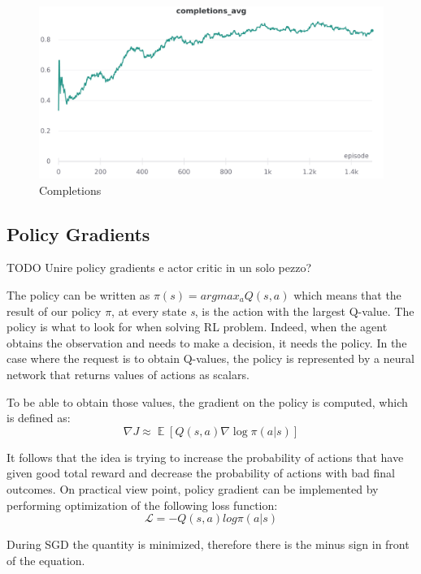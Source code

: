 \documentclass[12pt]{article}
\DeclareMathOperator{\EX}{\mathbb{E}}%
\begin{document}
\begin{figure}[H]
        \centerline{\includegraphics[scale=.2]{res/charts/per_completions.png}}
        \caption{Completions}
\end{figure}

\subsection{Policy Gradients}

TODO Unire policy gradients e actor critic in un solo pezzo?

The policy can be written as $\pi(s)= argmax_aQ(s,a)$ which means that the result of our policy $\pi$, at every state \textit{s}, is the action with the largest Q-value.
The policy is what to look for when solving RL problem. Indeed, when the agent obtains the observation and needs to make a decision, it needs the policy.
In the case where the request is to obtain Q-values, the policy is represented by a neural network that returns values of actions as scalars. 

To be able to obtain those values, the gradient on the policy is computed, which is defined as:
\begin{equation}
    \nabla J \approx \EX[Q(s, a) \nabla \log \pi (a | s) ]
\end{equation}

It follows that the idea is trying to increase the probability of actions that have given good total reward and decrease the probability of actions with bad final outcomes.
On practical view point, policy gradient can be implemented by performing optimization of the following loss function:
\[ \mathcal{L}= -Q(s,a)log \pi(a|s)\]

During SGD the quantity is minimized, therefore there is the minus sign in front of the equation.
\end{document}
